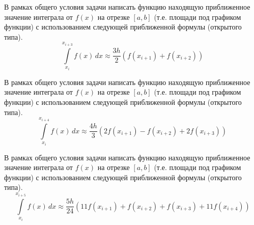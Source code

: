 
\begin{zztask}
В рамках общего условия задачи написать функцию находящую приближенное значение 
интеграла от $f(x)$ на отрезке $[a, b]$ (т.е. площади под графиком функции)
с использованием следующей приближенной формулы (открытого типа). 
\[
\int\limits_{x_i}^{x_{i+3}} f(x)\,dx \approx \frac{3h}{2} \left( f(x_{i+1}) + f(x_{i+2}) \right)
\]
\end{zztask}


\begin{zztask}
В рамках общего условия задачи написать функцию находящую приближенное значение 
интеграла от $f(x)$ на отрезке $[a, b]$ (т.е. площади под графиком функции)
с использованием следующей приближенной формулы (открытого типа). 
\[
\int\limits_{x_i}^{x_{i+4}} f(x)\,dx \approx \frac{4h}{3} \left( 2f(x_{i+1}) - f(x_{i+2}) + 2f(x_{i+3}) \right)
\]
\end{zztask}


\begin{zztask}
В рамках общего условия задачи написать функцию находящую приближенное значение 
интеграла от $f(x)$ на отрезке $[a, b]$ (т.е. площади под графиком функции)
с использованием следующей приближенной формулы (открытого типа). 
\[
\int\limits_{x_i}^{x_{i+5}} f(x)\,dx \approx 
\frac{5h}{24} \left( 11 f(x_{i+1}) + f(x_{i+2}) + f(x_{i+3}) + 11f(x_{i+4}) \right)
\]
\end{zztask}

